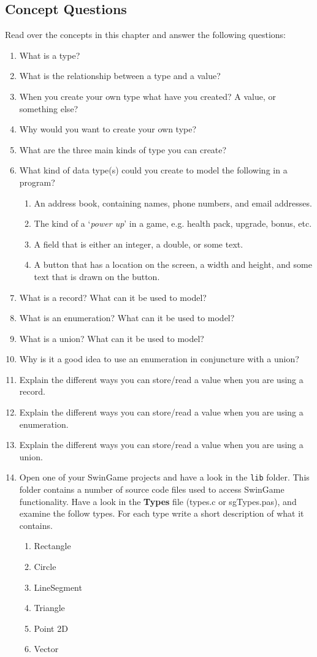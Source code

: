 \subsection{Concept Questions} %
\label{sub:concept_questions_types}

Read over the concepts in this chapter and answer the following questions:
\begin{enumerate}
  \item What is a type?
  \item What is the relationship between a type and a value? 
  \item When you create your own type what have you created? A value, or something else?
  \item Why would you want to create your own type?
  \item What are the three main kinds of type you can create?
  \item What kind of data type(s) could you create to model the following in a program?
  \begin{enumerate}
    \item An address book, containing names, phone numbers, and email addresses.
    \item The kind of a `\emph{power up}' in a game, e.g. health pack, upgrade, bonus, etc.
    \item A field that is either an integer, a double, or some text.
    \item A button that has a location on the screen, a width and height, and some text that is drawn on the button.
  \end{enumerate}
  \item What is a record? What can it be used to model?
  \item What is an enumeration? What can it be used to model?
  \item What is a union? What can it be used to model?
  \item Why is it a good idea to use an enumeration in conjuncture with a union?
  \item Explain the different ways you can store/read a value when you are using a record.
  \item Explain the different ways you can store/read a value when you are using a enumeration.
  \item Explain the different ways you can store/read a value when you are using a union.
  \item Open one of your SwinGame projects and have a look in the \texttt{lib} folder. This folder contains a number of source code files used to access SwinGame functionality. Have a look in the \textbf{Types} file (types.c or sgTypes.pas), and examine the follow types. For each type write a short description of what it contains.
  \begin{enumerate}
    \item Rectangle
    \item Circle
    \item LineSegment
    \item Triangle
    \item Point 2D
    \item Vector
  \end{enumerate}
\end{enumerate}
